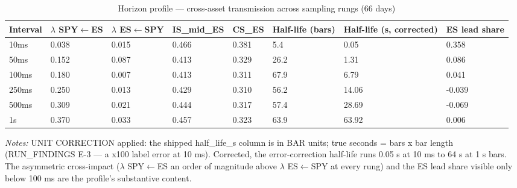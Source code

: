 \begin{table}[htbp]\centering
\caption{Horizon profile — cross-asset transmission across sampling rungs (66 days)}
\label{tab:t13}
\small
\begin{tabular}{llllllll}
\toprule
Interval & $\lambda$ SPY$\leftarrow$ES & $\lambda$ ES$\leftarrow$SPY & IS\_mid\_ES & CS\_ES & Half-life (bars) & Half-life (s, corrected) & ES lead share \\
\midrule
10ms & 0.038 & 0.015 & 0.466 & 0.381 & 5.4 & 0.05 & 0.358 \\
50ms & 0.152 & 0.087 & 0.413 & 0.329 & 26.2 & 1.31 & 0.086 \\
100ms & 0.180 & 0.007 & 0.413 & 0.311 & 67.9 & 6.79 & 0.041 \\
250ms & 0.250 & 0.013 & 0.429 & 0.310 & 56.2 & 14.06 & -0.039 \\
500ms & 0.309 & 0.021 & 0.444 & 0.317 & 57.4 & 28.69 & -0.069 \\
1s & 0.370 & 0.033 & 0.457 & 0.323 & 63.9 & 63.92 & 0.006 \\
\bottomrule
\end{tabular}
\begin{minipage}{\linewidth}\vspace{2pt}\footnotesize\emph{Notes:} UNIT CORRECTION applied: the shipped half\_life\_s column is in BAR units; true seconds = bars x bar length (RUN\_FINDINGS E-3 — a x100 label error at 10 ms). Corrected, the error-correction half-life runs 0.05 s at 10 ms to 64 s at 1 s bars. The asymmetric cross-impact ($\lambda$ SPY$\leftarrow$ES an order of magnitude above $\lambda$ ES$\leftarrow$SPY at every rung) and the ES lead share visible only below 100 ms are the profile's substantive content.\end{minipage}
\end{table}
